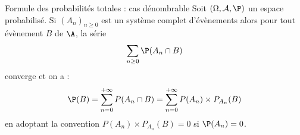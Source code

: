 \documentclass[a4paper,10pt]{report}
\begin{document}
\begin{itemize}
\begin{Theoreme}{Formule des probabilités totales : cas dénombrable}
Soit $(\Omega, \mathcal{A}, \P)$ un espace probabilisé. Si $(A_n)_{n \geq 0}$ est un système complet d'évènements alors pour tout évènement $B$ de $\A$, la série 
$$ \sum_{n \geq 0} \P(A_n \cap B)$$
converge et on a :
$$ \P(B) = \sum_{n=0}^{+ \infty} P(A_n \cap B) = \sum_{n=0}^{+ \infty} P(A_n) \times P_{A_n}( B)$$
en adoptant la convention $P(A_n) \times P_{A_n}( B)=0$ si $\P(A_n)=0$.
\end{Theoreme}
%
\end{itemize}
\end{document}
